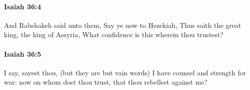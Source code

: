 		\paragraph{Isaiah 36:4} %
			\label{ISAIAH-36-4}

			And Rabshakeh said unto them, Say ye now to Hezekiah, Thus saith the great king, the king of Assyria, What confidence is this wherein thou trustest?


		\paragraph{Isaiah 36:5} %
			\label{ISAIAH-36-5}

			I say, sayest thou, (but they are but vain words) I have counsel and strength for war: now on whom dost thou trust, that thou rebellest against me?


